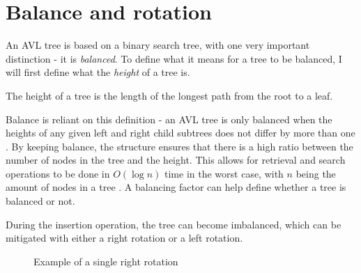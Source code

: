 \section{Balance and rotation}
An AVL tree is based on a binary search tree, with one very important distinction - it is \textit{balanced}. To define what it means for a tree to be balanced, I will first
define what the \textit{height} of a tree is.

\begin{definition}
  \label{def:height}
  The height of a tree is the length of the longest path from the root to a leaf.
\end{definition} 
 
Balance is reliant on this definition - an AVL tree is only balanced when the 
heights of any given left and right child subtrees does not differ by more than one \cite{avl:original}. By keeping balance, the structure ensures that there is a high ratio between the number of 
nodes in the tree and the height. This allows for retrieval and search operations to be done in $O(\log n)$ time in the worst case, with $n$ being the amount of nodes in a tree \cite{avl:computer}. A
balancing factor can help define whether a tree is balanced or not.

\begin{definition}
  \label{def:bf}
\end{definition}

During the insertion operation, the tree can become imbalanced, which can be mitigated
with either a right rotation or a left rotation. 

\begin{figure}[!h]
  \centering
  \hspace{1cm}%
  \caption{Example of a single right rotation}
  \label{fig:right_rotation}
\end{figure}